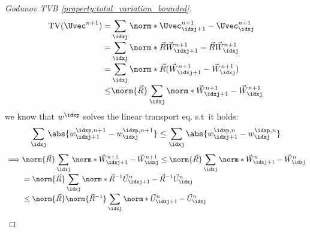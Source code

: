 \begin{proofbox}\nospacing
    \begin{proof}[Godunov TVB \cref{property:total_variation_bounded}]
        \label{proof:property:total_variation_bounded}
        \begin{align*}
          \text{TV}(\Uvec^{n+1})=&\sum_{\idxj}\norm*{\Uvec_{\idxj+1}^{n+1}-\Uvec_{\idxj}^{n+1}}\\[-1\jot]
          =&\sum_{\idxj}\norm*{\vec{R}\vec{W}_{\idxj+1}^{n+1}-\vec{R}\vec{W}_{\idxj}^{n+1}}\\[-1\jot]
              =&\sum_{\idxj}\norm*{\vec{R}(\vec{W}_{\idxj+1}^{n+1}-\vec{W}_{\idxj}^{n+1})}\\[-1\jot]
              \leq&\norm{\vec{R}}\sum_{\idxj}\norm*{\vec{W}_{\idxj+1}^{n+1}-\vec{W}_{\idxj}^{n+1}}
        \end{align*}
        we know that $w^{\idxp}$ solves the linear transport eq. s.t\ it holds:
        \begin{align*}
          \sum_{\idxj}\abs{w_{\idxj+1}^{\idxp,n+1}-w_{\idxj}^{\idxp,n+1}}
          \leq\sum_{\idxj}\abs{w_{\idxj+1}^{\idxp,n}-w_{\idxj}^{\idxp,n}}
        \end{align*}
        \begin{align*}
         \implies&\norm{\vec{R}}\sum_{\idxj}\norm*{\vec{W}_{\idxj+1}^{n+1}-\vec{W}_{\idxj}^{n+1}}\leq
        \norm{\vec{R}}\sum_{\idxj}\norm*{\vec{W}_{\idxj+1}^{n}-\vec{W}_{\idxj}^{n}}\\[-1\jot]
        &=\norm{\vec{R}}\sum_{\idxj}\norm*{\vec{R}^{-1}\vec{U}_{\idxj+1}^{n}-\vec{R}^{-1}\vec{U}_{\idxj}^{n}}\\[-1\jot]
        &\leq\norm{\vec{R}}\norm{\vec{R}^{-1}}\sum_{\idxj}\norm*{\vec{U}_{\idxj+1}^{n}-\vec{U}_{\idxj}^{n}}
        \end{align*}
    \end{proof}
\end{proofbox}

